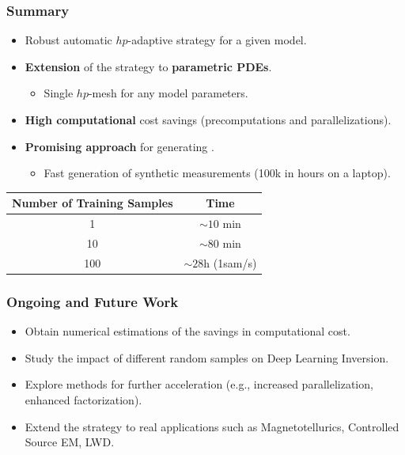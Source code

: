 \documentclass[10pt,aspectratio=149]{beamer}
\begin{document}
\begin{frame}[c]
	\frametitle{Summary}
	\vspace{5mm}
	\begin{itemize}
		\item Robust automatic $hp$-adaptive strategy for a given model.
		\vspace{7mm}
		\item \textbf{Extension} of the strategy to \textbf{parametric PDEs}.
		\vspace{3mm}
		\begin{itemize}
			\item Single $hp$-mesh for any model parameters.
		\end{itemize}
		\vspace{7mm}
		\item \textbf{High computational} cost savings (precomputations and parallelizations).
		\vspace{7mm}
		\item \textbf{Promising approach} for generating .
		\vspace{3mm}
		\begin{itemize}
			\item Fast generation of synthetic measurements (100k in hours on a laptop).
		\end{itemize}
	\end{itemize}
	\begin{center}
    \begin{tabular}{|c|c|}
      \hline
      \textbf{Number of  Training Samples} & \textbf{Time} \\
      \hline
      1 & $\sim10$ min \\
      10 & $\sim80$ min \\
      100 & $\sim28$h (1sam/s) \\
      \hline
    \end{tabular}
  \end{center}
\end{frame}
\begin{frame}
	\frametitle{Ongoing and Future Work}
	\begin{itemize}
		\item Obtain numerical estimations of the savings in computational cost.
		\vspace{5mm}
		\item Study the impact of different random samples on Deep Learning Inversion.
		\vspace{5mm}
		\item Explore methods for further acceleration (e.g., increased parallelization, enhanced factorization).
		\vspace{5mm}
		\item Extend the strategy to real applications such as Magnetotellurics, Controlled Source EM, LWD.
	\end{itemize}
\end{frame}
\end{document}
